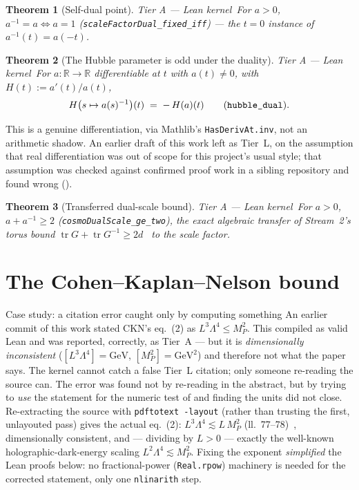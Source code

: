 \documentclass[11pt,a4paper]{article}
\newtheorem{theorem}{Theorem}[section]
\theoremstyle{remark}
\newcommand{\tierA}{\colorbox{green!15}{\textsf{\scriptsize Tier A --- Lean kernel}}}
\begin{document}
\begin{theorem}[Self-dual point] \label{thm:fixed} \tierA\
For $a>0$, $a^{-1}=a\iff a=1$ \textnormal{(}\texttt{scaleFactorDual\_fixed\_iff}\textnormal{)} ---
the $t=0$ instance of $a^{-1}(t)=a(-t)$.
\end{theorem}

\begin{theorem}[The Hubble parameter is odd under the duality] \label{thm:hubble} \tierA\
For $a:\mathbb{R}\to\mathbb{R}$ differentiable at $t$ with $a(t)\ne0$, with
$H(t):=a'(t)/a(t)$,
\[
H\big(s\mapsto a(s)^{-1}\big)(t)\;=\;-\,H(a)(t) \qquad \textnormal{(\texttt{hubble\_dual})}.
\]
\end{theorem}
This is a genuine differentiation, via Mathlib's \texttt{HasDerivAt.inv}, not an arithmetic
shadow. An earlier draft of this work left  as Tier~L, on the assumption that
real differentiation was out of scope for this project's usual style; that assumption was checked
against confirmed proof work in a sibling repository and found wrong (\Cref{sec:methods}).

\begin{theorem}[Transferred dual-scale bound] \label{thm:sum} \tierA\
For $a>0$, $a+a^{-1}\ge2$ \textnormal{(}\texttt{cosmoDualScale\_ge\_two}\textnormal{)}, the exact
algebraic transfer of Stream~2's torus bound
$\operatorname{tr}G+\operatorname{tr}G^{-1}\ge2d$~\cite{Callens2026Paper8} to the scale factor.
\end{theorem}

\section{The Cohen--Kaplan--Nelson bound}
\label{sec:ckn}

\begin{casebox}{Case study: a citation error caught only by computing something}
An earlier commit of this work stated CKN's eq.~(2) as $L^3\Lambda^4\le M_P^2$. This compiled as
valid Lean and was reported, correctly, as Tier~A --- but it is \emph{dimensionally
inconsistent} ($[L^3\Lambda^4]=\mathrm{GeV}$, $[M_P^2]=\mathrm{GeV}^2$) and therefore not what the
paper says. The kernel cannot catch a false Tier~L citation; only someone re-reading the source
can. The error was found not by re-reading in the abstract, but by trying to \emph{use} the
statement for the numeric test of \Cref{sec:falsify} and finding the units did not close.
Re-extracting the source with \texttt{pdftotext~-layout} (rather than trusting the first,
unlayouted pass) gives the actual eq.~(2): $L^3\Lambda^4\lesssim L\,M_P^2$
(ll.~77--78)~\cite{CKN1999}, dimensionally consistent, and — dividing by $L>0$ — exactly the
well-known holographic-dark-energy scaling $L^2\Lambda^4\lesssim M_P^2$. Fixing the exponent
\emph{simplified} the Lean proofs below: no fractional-power (\texttt{Real.rpow}) machinery is
needed for the corrected statement, only one \texttt{nlinarith} step.
\end{casebox}
\end{document}
